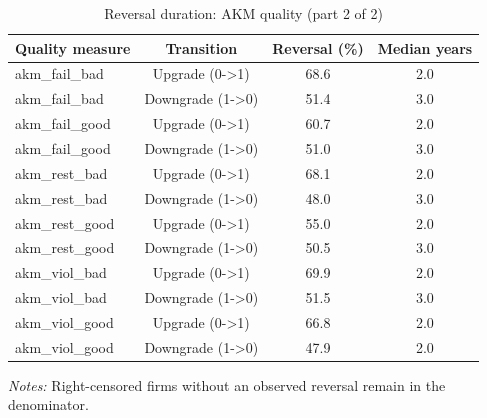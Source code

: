 \begin{table}[htbp]
\footnotesize
\centering
\caption{Reversal duration: AKM quality (part 2 of 2)}
\begin{threeparttable}
\begin{tabular}{p{}ccc}
\toprule
Quality measure & Transition & Reversal (\%) & Median years \\
\midrule
akm\_fail\_bad & Upgrade (0->1) & 68.6 & 2.0 \\
akm\_fail\_bad & Downgrade (1->0) & 51.4 & 3.0 \\
akm\_fail\_good & Upgrade (0->1) & 60.7 & 2.0 \\
akm\_fail\_good & Downgrade (1->0) & 51.0 & 3.0 \\
akm\_rest\_bad & Upgrade (0->1) & 68.1 & 2.0 \\
akm\_rest\_bad & Downgrade (1->0) & 48.0 & 3.0 \\
akm\_rest\_good & Upgrade (0->1) & 55.0 & 2.0 \\
akm\_rest\_good & Downgrade (1->0) & 50.5 & 3.0 \\
akm\_viol\_bad & Upgrade (0->1) & 69.9 & 2.0 \\
akm\_viol\_bad & Downgrade (1->0) & 51.5 & 3.0 \\
akm\_viol\_good & Upgrade (0->1) & 66.8 & 2.0 \\
akm\_viol\_good & Downgrade (1->0) & 47.9 & 2.0 \\
\bottomrule
\end{tabular}
\begin{tablenotes}\footnotesize
\item \raggedright \textit{Notes:} Right-censored firms without an observed reversal remain in the denominator.
\end{tablenotes}
\end{threeparttable}
\end{table}
